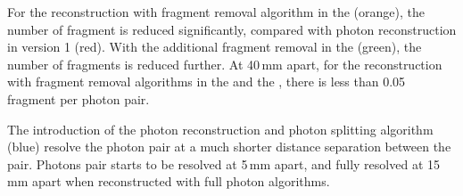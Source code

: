 

For the reconstruction with fragment removal algorithm in the \ECAL (orange), the number of fragment is reduced significantly, compared with photon reconstruction in \pandora version 1 (red). With the additional fragment removal in the \HCAL (green), the number of fragments is reduced further. At 40\,mm apart, for the reconstruction with fragment removal algorithms in the \ECAL and the \HCAL, there is less than 0.05 fragment per photon pair.

The introduction of the photon reconstruction and photon splitting algorithm (blue) resolve the photon pair at a much shorter distance separation between the pair. Photons pair starts to be resolved at 5\,mm apart, and fully resolved at 15\,mm apart when reconstructed with full photon algorithms.


